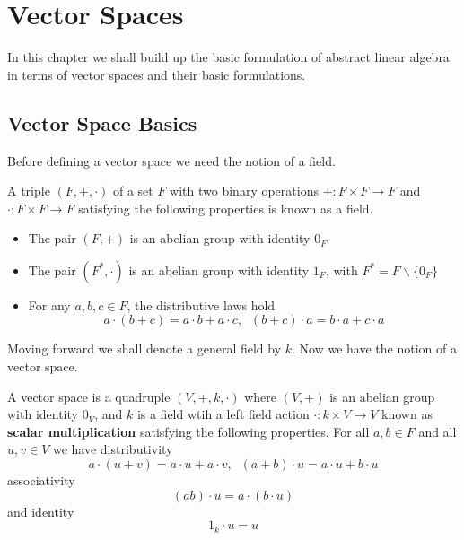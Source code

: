 \chapter{Vector Spaces}\label{VecSpaces}

In this chapter we shall build up the basic formulation of abstract linear algebra in terms of vector spaces and their basic formulations.

\section{Vector Space Basics}\label{sec:vecSps}

Before defining a vector space we need the notion of a field.

\begin{definition}
    A triple $(F,+,\cdot)$ of a set $F$ with two binary operations $+:F\times F\rightarrow F$ and $\cdot:F\times F\rightarrow F$ satisfying the following properties is known as a field. \begin{itemize}
        \item The pair $(F,+)$ is an abelian group with identity $0_F$
        \item The pair $(F^*,\cdot)$ is an abelian group with identity $1_F$, with $F^* = F\backslash\{0_F\}$
        \item For any $a,b,c \in F$, the distributive laws hold \begin{equation*}
            a\cdot(b+c) = a\cdot b+a\cdot c,\;\;(b+c)\cdot a = b\cdot a + c\cdot a
        \end{equation*}
    \end{itemize}
\end{definition} 

Moving forward we shall denote a general field by $k$. Now we have the notion of a vector space.

\begin{definition}
    A vector space is a quadruple $(V,+,k,\cdot)$ where $(V,+)$ is an abelian group with identity $0_V$, and $k$ is a field wtih a left field action $\cdot:k\times V\rightarrow V$ known as \textbf{scalar multiplication} satisfying the following properties. For all $a,b \in F$ and all $u,v \in V$ we have distributivity \begin{equation*}
                a\cdot (u+v) = a\cdot u + a \cdot v,\;\; (a+b)\cdot u = a\cdot u + b\cdot u
    \end{equation*}
        associativity \begin{equation*}
            (ab)\cdot u = a\cdot (b\cdot u)
        \end{equation*}
        and identity \begin{equation*}
            1_k\cdot u = u
            \end{equation*}
\end{definition}

